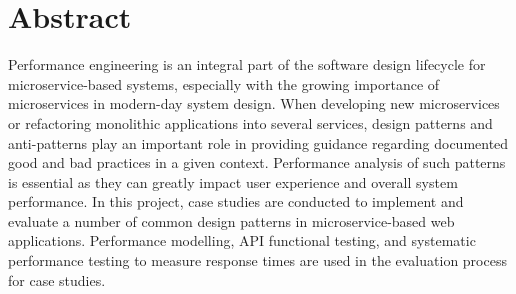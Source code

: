 \chapter*{Abstract}

Performance engineering is an integral part of the software design lifecycle for microservice-based systems, especially with the growing importance of microservices in modern-day system design. When developing new microservices or refactoring monolithic applications into several services, design patterns and anti-patterns play an important role in providing guidance regarding documented good and bad practices in a given context. Performance analysis of such patterns is essential as they can greatly impact user experience and overall system performance. In this project, case studies are conducted to implement and evaluate a number of common design patterns in microservice-based web applications. Performance modelling, API functional testing, and systematic performance testing to measure response times are used in the evaluation process for case studies.
